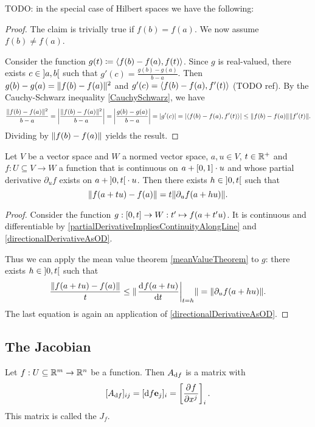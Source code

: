 TODO: in the special case of Hilbert spaces we have the following:
\begin{proof}
The claim is trivially true if $f(b) = f(a)$. We now assume $f(b) \neq f(a)$.

Consider the function $g(t) \defeq \inner{f(b)-f(a), f(t)}$. Since $g$ is real-valued, there exists $c\in \interval[o]{a,b}$ such that $g'(c) = \frac{g(b)-g(a)}{b-a}$. Then $g(b)-g(a) = \lVert f(b)-f(a)\rVert^2$ and $g'(c) = \inner{f(b)-f(a), f'(t)}$ (TODO ref). By the Cauchy-Schwarz inequality \ref{CauchySchwarz}, we have
\[ \frac{\norm{f(b)-f(a)}^2}{b-a} = \left|\frac{\norm{f(b)-f(a)}^2}{b-a}\right| = \left|\frac{g(b)-g(a)}{b-a}\right| = |g'(c)| = |\inner{f(b)-f(a), f'(t)}| \leq \norm{f(b)-f(a)} \norm{f'(t)}. \]
Dividing by $\lVert f(b)-f(a)\rVert$ yields the result.
\end{proof}
\begin{corollary} \label{meanValueTheoremGateauxDerivative}
Let $V$ be a vector space and $W$ a normed vector space, $a,u\in V$, $t\in\mathbb{R}^+$ and $f: U\subseteq V\to W$ a function that is continuous on $a+\interval{0,1}\cdot u$ and whose partial derivative $\partial_u f$ exists on $a+\interval[o]{0,t}\cdot u$. Then there exists $h\in \interval[o]{0,t}$ such that
\[ \lVert f(a+tu) - f(a)\rVert = t\lVert\partial_u f(a+hu)\rVert. \]
\end{corollary}
\begin{proof}
Consider the function $g: \interval{0,t} \to W: t'\mapsto f(a+t'u)$. It is continuous and differentiable by \ref{partialDerivativeImpliesContinuityAlongLine} and \ref{directionalDerivativeAsOD}.

Thus we can apply the mean value theorem \ref{meanValueTheorem} to $g$: there exists $h\in \interval[o]{0,t}$ such that
\[ \frac{\lVert f(a+tu) - f(a)\rVert}{t} \leq \lVert\left.\mathinner{ \dfrac{\operatorname{d \!}{^{}}f(a+tu)}{\operatorname{d \!}{{t}^{}}} }\right|_{t=h}\rVert = \lVert\partial_u f(a+hu)\rVert. \]
The last equation is again an application of \ref{directionalDerivativeAsOD}.
\end{proof}


\subsection{The Jacobian}
\begin{definition}
Let $f:U\subseteq\mathbb{R}^m\to\mathbb{R}^n$ be a function. Then $A_{\operatorname{d \!}{f}}$ is a matrix with
\[ [A_{\operatorname{d \!}{f}}]_{ij} = [\operatorname{d \!}{f}\boldsymbol{\mathrm{e}}_j]_i = \left[ \frac{\partial{^{}}f}{\partial{{x^j}^{}}} \right]_i. \]
This matrix is called the  $J_f$.
\end{definition}

